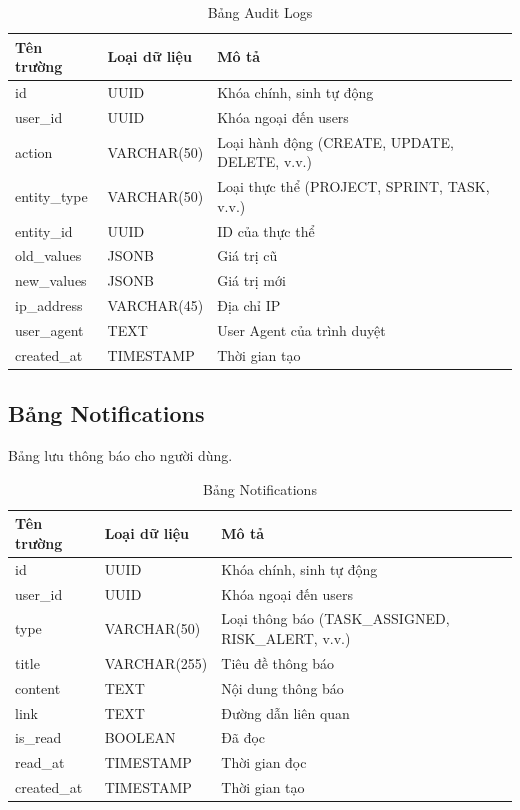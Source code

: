 \documentclass[12pt,a4paper]{report}
\begin{document}
\begin{table}[H]
\centering
\caption{Bảng Audit Logs}
\begin{tabular}{|p{4cm}|p{4cm}|p{7cm}|}
\hline
\textbf{Tên trường} & \textbf{Loại dữ liệu} & \textbf{Mô tả} \\
\hline
id & UUID & Khóa chính, sinh tự động \\
\hline
user\_id & UUID & Khóa ngoại đến users \\
\hline
action & VARCHAR(50) & Loại hành động (CREATE, UPDATE, DELETE, v.v.) \\
\hline
entity\_type & VARCHAR(50) & Loại thực thể (PROJECT, SPRINT, TASK, v.v.) \\
\hline
entity\_id & UUID & ID của thực thể \\
\hline
old\_values & JSONB & Giá trị cũ \\
\hline
new\_values & JSONB & Giá trị mới \\
\hline
ip\_address & VARCHAR(45) & Địa chỉ IP \\
\hline
user\_agent & TEXT & User Agent của trình duyệt \\
\hline
created\_at & TIMESTAMP & Thời gian tạo \\
\hline
\end{tabular}
\label{tab:audit_logs_table}
\end{table}


\subsection{Bảng Notifications}

Bảng lưu thông báo cho người dùng.

\begin{table}[H]
\centering
\caption{Bảng Notifications}
\begin{tabular}{|p{4cm}|p{4cm}|p{7cm}|}
\hline
\textbf{Tên trường} & \textbf{Loại dữ liệu} & \textbf{Mô tả} \\
\hline
id & UUID & Khóa chính, sinh tự động \\
\hline
user\_id & UUID & Khóa ngoại đến users \\
\hline
type & VARCHAR(50) & Loại thông báo (TASK\_ASSIGNED, RISK\_ALERT, v.v.) \\
\hline
title & VARCHAR(255) & Tiêu đề thông báo \\
\hline
content & TEXT & Nội dung thông báo \\
\hline
link & TEXT & Đường dẫn liên quan \\
\hline
is\_read & BOOLEAN & Đã đọc \\
\hline
read\_at & TIMESTAMP & Thời gian đọc \\
\hline
created\_at & TIMESTAMP & Thời gian tạo \\
\hline
\end{tabular}
\label{tab:notifications_table}
\end{table}
\end{document}
